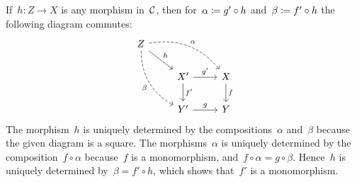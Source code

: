 \section{}


If~$h \colon Z \to X$ is any morphism in~$\mathcal{C}$, then for~$\alpha \coloneqq g' \circ h$ and~$\beta \coloneqq f' \circ h$ the following diagram commutes:
\[
  \begin{tikzcd}
      Z
      \arrow[dashed,bend left]{drr}[above right]{\alpha}
      \arrow{dr}[above right]{h}
      \arrow[dashed,bend right]{ddr}[below left]{\beta}
    & {}
    & {}
    \\
      {}
    & X'
      \arrow{r}[above]{g'}
      \arrow{d}[right]{f'}
    & X
      \arrow{d}[right]{f}
    \\
      {}
    & Y'
      \arrow{r}[above]{g}
    & Y
  \end{tikzcd}
\]
The morphism~$h$ is uniquely determined by the compositions~$\alpha$ and~$\beta$ because the given diagram is a {\pb} square.
The morphisms~$\alpha$ is uniquely determined by the composition~$f \circ \alpha$ because~$f$ is a monomorphism, and~$f \circ \alpha = g \circ \beta$.
Hence~$h$ is uniquely determined by~$\beta = f' \circ h$, which shows that~$f'$ is a monomorphism.


